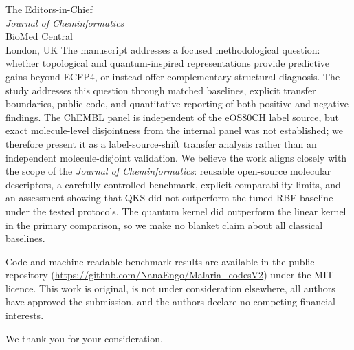 \documentclass[10pt,a4paper]{letter}
\begin{document}
\begin{letter}{%
  The Editors-in-Chief \\
  \textit{Journal of Cheminformatics} \\
  BioMed Central \\
  London, UK
}
The manuscript addresses a focused methodological question: whether topological and quantum-inspired representations provide predictive gains beyond ECFP4, or instead offer complementary structural diagnosis. The study addresses this question through matched baselines, explicit transfer boundaries, public code, and quantitative reporting of both positive and negative findings. The ChEMBL panel is independent of the eOS80CH label source, but exact molecule-level disjointness from the internal panel was not established; we therefore present it as a label-source-shift transfer analysis rather than an independent molecule-disjoint validation. We believe the work aligns closely with the scope of the \textit{Journal of Cheminformatics}: reusable open-source molecular descriptors, a carefully controlled benchmark, explicit comparability limits, and an assessment showing that QKS did not outperform the tuned RBF baseline under the tested protocols. The quantum kernel did outperform the linear kernel in the primary comparison, so we make no blanket claim about all classical baselines.

Code and machine-readable benchmark results are available in the public repository (\url{https://github.com/NanaEngo/Malaria_codesV2}) under the MIT licence. This work is original, is not under consideration elsewhere, all authors have approved the submission, and the authors declare no competing financial interests.

\closing{We thank you for your consideration.}

\end{letter}
\end{document}
